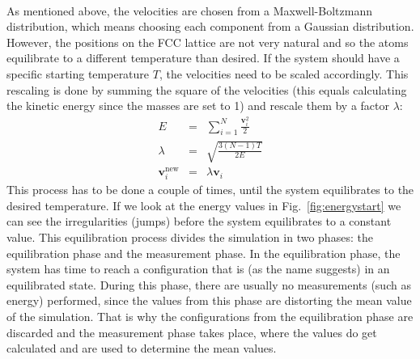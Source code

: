 \documentclass[12pt]{article}
\begin{document}
\\As mentioned above, the velocities are chosen from a Maxwell-Boltzmann distribution, which means choosing each component from a Gaussian
distribution. However, the positions on the FCC lattice are not very natural and so the atoms equilibrate to a different temperature than desired.
If the system should have a
specific starting temperature $T$, the velocities need to be scaled accordingly. This rescaling is done by summing the square of the velocities
(this equals calculating the kinetic energy since the masses are set to 1) and rescale them by a factor $\lambda$:
\begin{eqnarray}
\label{eq:rescale1}   E &=& \sum_{i=1}^N \frac{\mathbf{v}_i^2}{2} \\
 \label{eq:rescale2}   \lambda &=& \sqrt{\frac{3(N-1)T}{2E}} \\
 \label{eq:rescale3}   \mathbf{v}_i^\text{new} &=& \lambda \mathbf{v}_i  
\end{eqnarray}
This process has to be done a couple of times, until the system equilibrates to the desired temperature. 
If we look at the energy values in Fig.~\ref{fig:energystart} we can see the
irregularities (jumps) before the system equilibrates to a constant value. This equilibration process divides the simulation in two phases: the equilibration
phase and the measurement phase. In the equilibration phase, the system has time to reach a configuration that is (as the name suggests) in an 
equilibrated state. During this phase, there are usually no measurements (such as energy) performed, since the values from this phase are distorting
the mean value of the simulation. That is why the configurations from the equilibration phase are discarded and the measurement phase takes place, 
where the values do get calculated and are used to determine the mean values.  
\end{document}
